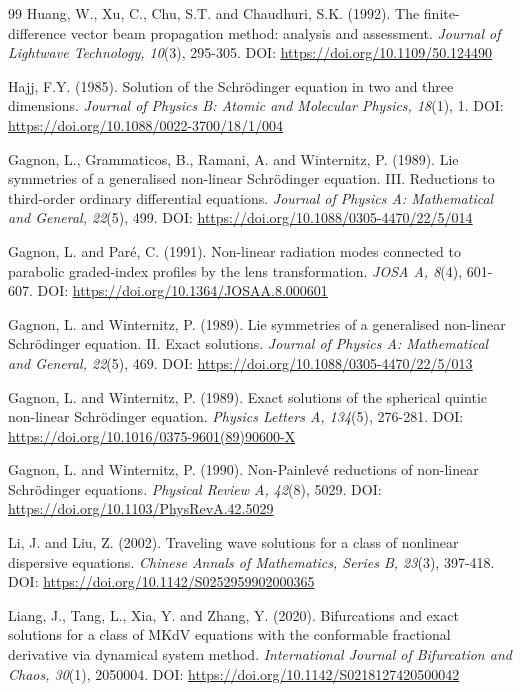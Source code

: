 \documentclass[10pt]{NSP1}
\numberwithin{equation}{section}
\begin{document}
\begin{thebibliography}{99}
 Huang, W., Xu, C., Chu, S.T. and Chaudhuri, S.K. (1992). The finite-difference vector beam propagation method: analysis and assessment. \emph{Journal of Lightwave Technology, 10}(3), 295-305. DOI: \url{https://doi.org/10.1109/50.124490}

 Hajj, F.Y. (1985). Solution of the Schr\"odinger equation in two and three dimensions. \emph{Journal of Physics B: Atomic and Molecular Physics, 18}(1), 1. DOI: \url{https://doi.org/10.1088/0022-3700/18/1/004}

 Gagnon, L., Grammaticos, B., Ramani, A. and Winternitz, P. (1989). Lie symmetries of a generalised non-linear Schr\"odinger equation. III. Reductions to third-order ordinary differential equations. \emph{Journal of Physics A: Mathematical and General, 22}(5), 499. DOI: \url{https://doi.org/10.1088/0305-4470/22/5/014}

 Gagnon, L. and Par\'e, C. (1991). Non-linear radiation modes connected to parabolic graded-index profiles by the lens transformation. \emph{JOSA A, 8}(4), 601-607. DOI: \url{https://doi.org/10.1364/JOSAA.8.000601}

 Gagnon, L. and Winternitz, P. (1989). Lie symmetries of a generalised non-linear Schr\"odinger equation. II. Exact solutions. \emph{Journal of Physics A: Mathematical and General, 22}(5), 469. DOI: \url{https://doi.org/10.1088/0305-4470/22/5/013}

 Gagnon, L. and Winternitz, P. (1989). Exact solutions of the spherical quintic non-linear Schr\"odinger equation. \emph{Physics Letters A, 134}(5), 276-281. DOI: \url{https://doi.org/10.1016/0375-9601(89)90600-X}

 Gagnon, L. and Winternitz, P. (1990). Non-Painlev\'e reductions of non-linear Schr\"odinger equations. \emph{Physical Review A, 42}(8), 5029. DOI: \url{https://doi.org/10.1103/PhysRevA.42.5029}

 Li, J. and Liu, Z. (2002). Traveling wave solutions for a class of nonlinear dispersive equations. \emph{Chinese Annals of Mathematics, Series B, 23}(3), 397-418. DOI: \url{https://doi.org/10.1142/S0252959902000365}

 Liang, J., Tang, L., Xia, Y. and Zhang, Y. (2020). Bifurcations and exact solutions for a class of MKdV equations with the conformable fractional derivative via dynamical system method. \emph{International Journal of Bifurcation and Chaos, 30}(1), 2050004.%
DOI: \url{https://doi.org/10.1142/S0218127420500042}

\end{thebibliography}
\end{document}
